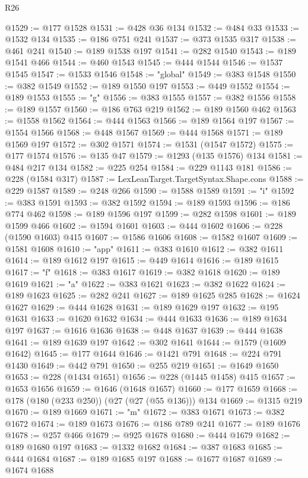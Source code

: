 \begin{lexlean}{R26}
\begin{coremodule}
@1529 := @177 @1528
@1531 := @428 @36 @134
@1532 := @484 @33
@1533 := @1532 @134
@1535 := @186 @751 @241
@1537 := @373 @1535 @317
@1538 := @461 @241
@1540 := @189 @1538 @197
@1541 := @282 @1540
@1543 := @189 @1541 @466
@1544 := @460 @1543
@1545 := @444 @1544
@1546 := @1537 @1545
@1547 := @1533 @1546
@1548 := "global"
@1549 := @383 @1548
@1550 := @382 @1549
@1552 := @189 @1550 @197
@1553 := @449 @1552
@1554 := @189 @1553
@1555 := "g"
@1556 := @383 @1555
@1557 := @382 @1556
@1558 := @189 @1557
@1560 := @186 @763 @219
@1562 := @189 @1560 @462
@1563 := @1558 @1562
@1564 := @444 @1563
@1566 := @189 @1564 @197
@1567 := @1554 @1566
@1568 := @448 @1567
@1569 := @444 @1568
@1571 := @189 @1569 @197
@1572 := @302 @1571
@1574 := @1531 (@1547 @1572)
@1575 := @177 @1574
@1576 := @135 @47
@1579 := @1293 (@135 @1576) @134
@1581 := @484 @217 @134
@1582 := @225 @254
@1584 := @229 @1143 @181
@1586 := @228 (@1584 @317)
@1587 := LexLeanTarget.TargetSyntax.Shape.cons
@1588 := @229 @1587
@1589 := @248 @266
@1590 := @1588 @1589
@1591 := "i"
@1592 := @383 @1591
@1593 := @382 @1592
@1594 := @189 @1593
@1596 := @186 @774 @462
@1598 := @189 @1596 @197
@1599 := @282 @1598
@1601 := @189 @1599 @466
@1602 := @1594 @1601
@1603 := @444 @1602
@1606 := @228 (@1590 @1603) @415
@1607 := @1586 @1606
@1608 := @1582 @1607
@1609 := @1581 @1608
@1610 := "app"
@1611 := @383 @1610
@1612 := @382 @1611
@1614 := @189 @1612 @197
@1615 := @449 @1614
@1616 := @189 @1615
@1617 := "f"
@1618 := @383 @1617
@1619 := @382 @1618
@1620 := @189 @1619
@1621 := "a"
@1622 := @383 @1621
@1623 := @382 @1622
@1624 := @189 @1623
@1625 := @282 @241
@1627 := @189 @1625 @285
@1628 := @1624 @1627
@1629 := @444 @1628
@1631 := @189 @1629 @197
@1632 := @195 @1631
@1633 := @1620 @1632
@1634 := @444 @1633
@1636 := @189 @1634 @197
@1637 := @1616 @1636
@1638 := @448 @1637
@1639 := @444 @1638
@1641 := @189 @1639 @197
@1642 := @302 @1641
@1644 := @1579 (@1609 @1642)
@1645 := @177 @1644
@1646 := @1421 @791
@1648 := @224 @791 @1430
@1649 := @442 @791
@1650 := @255 @219
@1651 := @1649 @1650
@1653 := @228 (@1434 @1651)
@1656 := @228 (@1445 @1458) @415
@1657 := @1653 @1656
@1659 := @1646 (@1648 @1657)
@1660 := @177 @1659
@1668 := @178 (@180 (@233 @250)) (@27 (@27 (@55 @136))) @134
@1669 := @1315 @219
@1670 := @189 @1669
@1671 := "m"
@1672 := @383 @1671
@1673 := @382 @1672
@1674 := @189 @1673
@1676 := @186 @789 @241
@1677 := @189 @1676
@1678 := @257 @466
@1679 := @925 @1678
@1680 := @444 @1679
@1682 := @189 @1680 @197
@1683 := @1332 @1682
@1684 := @387 @1683
@1685 := @444 @1684
@1687 := @189 @1685 @197
@1688 := @1677 @1687
@1689 := @1674 @1688

\end{coremodule}
\end{lexlean}
